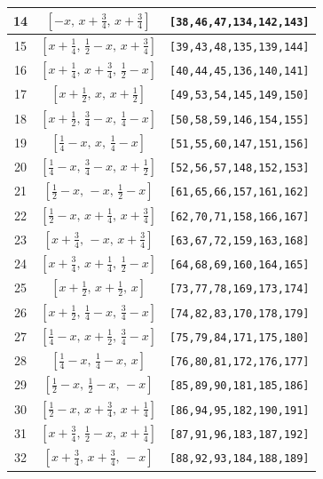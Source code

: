 \documentclass[fleqn,8pt]{jsarticle}
\begin{document}
\begin{longtable}{ccc}
14 & $\left[ - x,\, x + \frac{3}{4},\, x + \frac{3}{4} \right]$ & {\tt [38,46,47,134,142,143]} \\ \hline
15 & $\left[ x + \frac{1}{4},\, \frac{1}{2} - x,\, x + \frac{3}{4} \right]$ & {\tt [39,43,48,135,139,144]} \\ \hline
16 & $\left[ x + \frac{1}{4},\, x + \frac{3}{4},\, \frac{1}{2} - x \right]$ & {\tt [40,44,45,136,140,141]} \\ \hline
17 & $\left[ x + \frac{1}{2},\, x,\, x + \frac{1}{2} \right]$ & {\tt [49,53,54,145,149,150]} \\ \hline
18 & $\left[ x + \frac{1}{2},\, \frac{3}{4} - x,\, \frac{1}{4} - x \right]$ & {\tt [50,58,59,146,154,155]} \\ \hline
19 & $\left[ \frac{1}{4} - x,\, x,\, \frac{1}{4} - x \right]$ & {\tt [51,55,60,147,151,156]} \\ \hline
20 & $\left[ \frac{1}{4} - x,\, \frac{3}{4} - x,\, x + \frac{1}{2} \right]$ & {\tt [52,56,57,148,152,153]} \\ \hline
21 & $\left[ \frac{1}{2} - x,\, - x,\, \frac{1}{2} - x \right]$ & {\tt [61,65,66,157,161,162]} \\ \hline
22 & $\left[ \frac{1}{2} - x,\, x + \frac{1}{4},\, x + \frac{3}{4} \right]$ & {\tt [62,70,71,158,166,167]} \\ \hline
23 & $\left[ x + \frac{3}{4},\, - x,\, x + \frac{3}{4} \right]$ & {\tt [63,67,72,159,163,168]} \\ \hline
24 & $\left[ x + \frac{3}{4},\, x + \frac{1}{4},\, \frac{1}{2} - x \right]$ & {\tt [64,68,69,160,164,165]} \\ \hline
25 & $\left[ x + \frac{1}{2},\, x + \frac{1}{2},\, x \right]$ & {\tt [73,77,78,169,173,174]} \\ \hline
26 & $\left[ x + \frac{1}{2},\, \frac{1}{4} - x,\, \frac{3}{4} - x \right]$ & {\tt [74,82,83,170,178,179]} \\ \hline
27 & $\left[ \frac{1}{4} - x,\, x + \frac{1}{2},\, \frac{3}{4} - x \right]$ & {\tt [75,79,84,171,175,180]} \\ \hline
28 & $\left[ \frac{1}{4} - x,\, \frac{1}{4} - x,\, x \right]$ & {\tt [76,80,81,172,176,177]} \\ \hline
29 & $\left[ \frac{1}{2} - x,\, \frac{1}{2} - x,\, - x \right]$ & {\tt [85,89,90,181,185,186]} \\ \hline
30 & $\left[ \frac{1}{2} - x,\, x + \frac{3}{4},\, x + \frac{1}{4} \right]$ & {\tt [86,94,95,182,190,191]} \\ \hline
31 & $\left[ x + \frac{3}{4},\, \frac{1}{2} - x,\, x + \frac{1}{4} \right]$ & {\tt [87,91,96,183,187,192]} \\ \hline
32 & $\left[ x + \frac{3}{4},\, x + \frac{3}{4},\, - x \right]$ & {\tt [88,92,93,184,188,189]} \\
\end{longtable}
\end{document}
